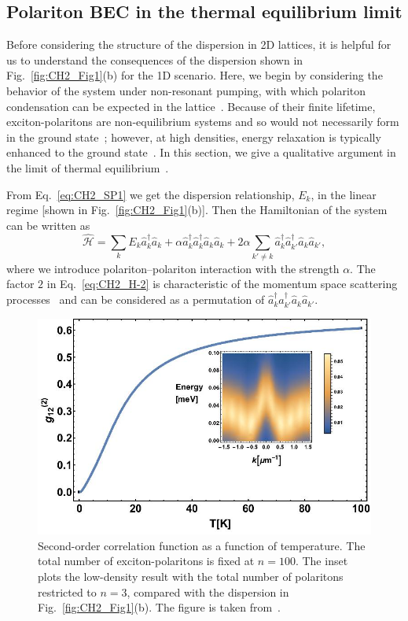 %
%
\subsection{Polariton BEC in the thermal equilibrium limit}
Before considering the structure of the dispersion in 2D lattices, it is helpful for us to understand the consequences of the dispersion shown in Fig.~\ref{fig:CH2_Fig1}(b) for the 1D scenario.
Here, we begin by considering the behavior of the system under non-resonant pumping, with which polariton condensation can be expected in the lattice~\cite{Lai:2007aa}.
Because of their finite lifetime, exciton-polaritons are non-equilibrium systems and so would not necessarily form in the ground state~\cite{Maragkou:2010aa}; however, at high densities, energy relaxation is typically enhanced to the ground state~\cite{Winkler:2016aa}.
In this section, we give a qualitative argument in the limit of thermal equilibrium~\cite{Sun:2017aa}.

From Eq.~\eqref{eq:CH2_SP1} we get the dispersion relationship, $E_k$, in the linear regime [shown in Fig.~\ref{fig:CH2_Fig1}(b)]. Then the Hamiltonian of the system can be written as
%
\begin{equation}
	\label{eq:CH2_H-2}
	\hat{\mathcal{H}}=\sum_k  E_k \hat{a}_k^\dag \hat{a}_k +\alpha \hat{a}_k^\dag \hat{a}_k^\dag \hat{a}_k \hat{a}_k + 2\alpha \sum_{k' \neq k} \hat{a}_k^\dag \hat{a}_{k'}^\dag \hat{a}_k \hat{a}_{k'},
\end{equation}
%
where we introduce polariton--polariton interaction with the strength $\alpha$. The factor $2$ in Eq.~\eqref{eq:CH2_H-2} is characteristic of the momentum space scattering processes~\cite{Whittaker:2005kg} and can be considered as a permutation of $\hat{a}_k^\dag \hat{a}_{k'}^\dag \hat{a}_k \hat{a}_{k'}$.
%
%
%
\begin{figure}[ht]
	\centering
	\includegraphics[width=0.65\linewidth]{Fig/Ch2/Fig2.jpg}
	\caption[Temperature-dependent $g_2$ function]{Second-order correlation function as a function of temperature. The total number of exciton-polaritons is fixed at $n=100$. The inset plots the low-density result with the total number of polaritons restricted to $n=3$, compared with the dispersion in Fig.~\ref{fig:CH2_Fig1}(b). The figure is taken from~\cite{Sun:2017ab}.}
	\label{fig:CH2_TMFig}
\end{figure}
%
%
%

